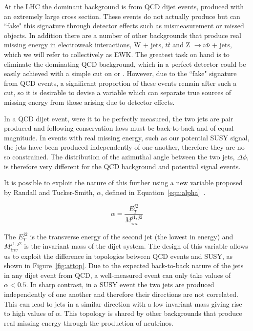 At the LHC the dominant background is from QCD dijet events, produced with an extremely large cross section. These events do not actually produce \met but can ``fake" this signature through detector effects such as mismeasurement or missed objects. In addition there are a number of other backgrounds that produce real missing energy in electroweak interactions, W + jets, $t \bar{t}$ and Z $\rightarrow \nu \bar{\nu}$ + jets, which we will refer to collectively as EWK. The greatest task on hand is to eliminate the dominating QCD background, which in a perfect detector could be easily achieved with a simple cut on \met or \mht. However, due to the ``fake" \met signature from QCD events, a significant proportion of these events remain after such a cut, so it is desirable to devise a variable which can separate true sources of missing energy from those arising due to detector effects. 

In a QCD dijet event, were it to be perfectly measured, the two jets are pair produced and following conservation laws must be back-to-back and of equal magnitude. In events with real missing energy, such as our potential SUSY signal, the jets have been produced independently of one another, therefore they are no so constrained. The distribution of the azimuthal angle between the two jets, $\Delta \phi$, is therefore very different for the QCD background and potential signal events.  


It is possible to exploit the nature of this further using a new variable proposed by Randall and Tucker-Smith, $\alpha$, defined in Equation~\ref{eqn:alpha}~\cite{Randall}. 

\begin{equation}
\alpha = \frac{E_{T}^{j2}}{M_{inv}^{j1,j2}}
\label{eqn:alpha}
\end{equation}

The $E_{T}^{j2}$ is the transverse energy of the second jet (the lowest in energy) and $M_{inv}^{j1,j2}$ is the invariant mass of the dijet system. The design of this variable allows us to exploit the difference in topologies between QCD events and SUSY, as shown in Figure~\ref{fig:attop}. Due to the expected back-to-back nature of the jets in any dijet event from QCD, a well-measured event can only take values of $\alpha < 0.5$. In sharp contrast, in a SUSY event the two jets are produced independently of one another and therefore their directions are not correlated. This can lead to jets in a similar direction with a low invariant mass giving rise to high values of $\alpha$. This topology is shared by other backgrounds that produce real missing energy through the production of neutrinos.


